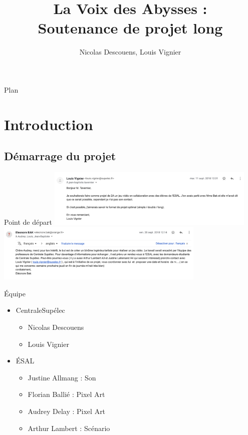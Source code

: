 \documentclass{beamer}
\title{La Voix des Abysses :\\Soutenance de projet long}
\author{Nicolas Descouens, Louis Vignier}
\institute{CentraleSupélec}
\begin{document}
\begin{frame}
  \titlepage
\end{frame}

\begin{frame}{Plan}
  \tableofcontents
\end{frame}

\section{Introduction}

\subsection{Démarrage du projet}

\begin{frame}{Point de départ}
    \centering
    \includegraphics[width=10cm]{assets/debut1}
    \includegraphics[width=10cm]{assets/debut2}
\end{frame}

\begin{frame}{Équipe}
    \begin{itemize}
        \item CentraleSupélec
        \begin{itemize}
            \item Nicolas Descouens
            \item Louis Vignier
        \end{itemize}
        \pause
        \item ÉSAL
        \begin{itemize}
            \item Justine Allmang : Son
            \item Florian Ballié : Pixel Art
            \item Audrey Delay : Pixel Art
            \item Arthur Lambert : Scénario
        \end{itemize}
    \end{itemize}
\end{frame}
\end{document}
